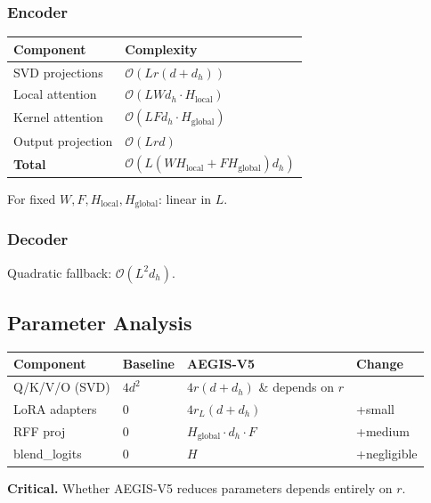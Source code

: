 \subsubsection{Encoder}

\begin{table}[H]
\centering
\small
\begin{tabular}{ll}
\toprule
\textbf{Component} & \textbf{Complexity} \\
\midrule
SVD projections & $\mathcal{O}(L r (d + d_h))$ \\
Local attention & $\mathcal{O}(L W d_h \cdot H_\text{local})$ \\
Kernel attention & $\mathcal{O}(L F d_h \cdot H_\text{global})$ \\
Output projection & $\mathcal{O}(L r d)$ \\
\textbf{Total} & $\mathcal{O}(L(W H_\text{local} + F H_\text{global}) d_h)$ \\
\bottomrule
\end{tabular}
\end{table}

For fixed $W, F, H_\text{local}, H_\text{global}$: linear in $L$.

\subsubsection{Decoder}

Quadratic fallback: $\mathcal{O}(L^2 d_h)$.

\subsection{Parameter Analysis}

\begin{table}[H]
\centering
\small
\begin{tabular}{llll}
\toprule
\textbf{Component} & \textbf{Baseline} & \textbf{AEGIS-V5} & \textbf{Change} \\
\midrule
Q/K/V/O (SVD) & $4 d^2$ & $4 r(d + d_h)$ \& depends on $r$ \\
LoRA adapters & 0 & $4 r_L (d + d_h)$ & +small \\
RFF proj & 0 & $H_\text{global} \cdot d_h \cdot F$ & +medium \\
blend\_logits & 0 & $H$ & +negligible \\
\bottomrule
\end{tabular}
\end{table}

\textbf{Critical.} Whether AEGIS-V5 reduces parameters depends entirely on $r$.

